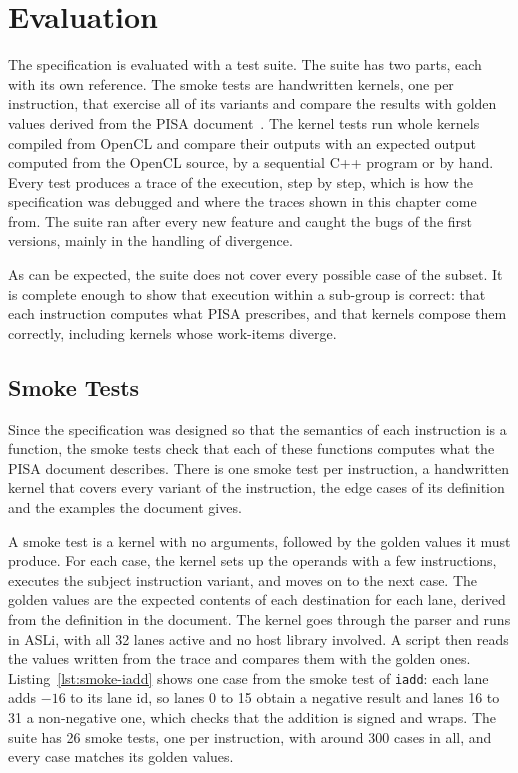 
\chapter{Evaluation}
\label{chap:evaluation}

The specification is evaluated with a test suite. The suite has two
parts, each with its own reference. The smoke tests are handwritten
kernels, one per instruction, that exercise all of its variants and
compare the results with golden values derived from the PISA
document~\cite{pisa-spec}. The kernel tests run whole kernels compiled
from OpenCL and compare their outputs with an expected output computed
from the OpenCL source, by a sequential C++ program or by hand.
Every test produces a trace of the execution, step by step, which is how
the specification was debugged and where the traces shown in this
chapter come from. The suite ran after every new feature and caught the
bugs of the first versions, mainly in the handling of divergence.

As can be expected, the suite does not cover every possible case of the
subset. It is complete enough to show that execution within a sub-group
is correct: that each instruction computes what PISA prescribes, and
that kernels compose them correctly, including kernels whose work-items
diverge.

\section{Smoke Tests}
\label{sec:eval-smoke}

Since the specification was designed so that the semantics of each
instruction is a function, the smoke tests check that each of these
functions computes what the PISA document describes. There is one smoke
test per instruction, a handwritten kernel that covers every variant of
the instruction, the edge cases of its definition and the examples the
document gives.

A smoke test is a kernel with no arguments, followed by the golden values
it must produce. For each case, the kernel sets up the operands with a
few instructions, executes the subject instruction variant, and moves on to
the next case. The golden values are the expected
contents of each destination for each lane, derived from the definition
in the document. The kernel goes through the parser and runs in ASLi,
with all 32 lanes active and no host library involved. A script then
reads the values written from the trace and compares them with the
golden ones. Listing~\ref{lst:smoke-iadd} shows one case from the smoke
test of \texttt{iadd}: each lane adds $-16$ to its lane id, so lanes 0
to 15 obtain a negative result and lanes 16 to 31 a non-negative one, which
checks that the addition is signed and wraps. The suite has 26 smoke tests, 
one per instruction, with around 300 cases in all, and every case matches 
its golden values.

